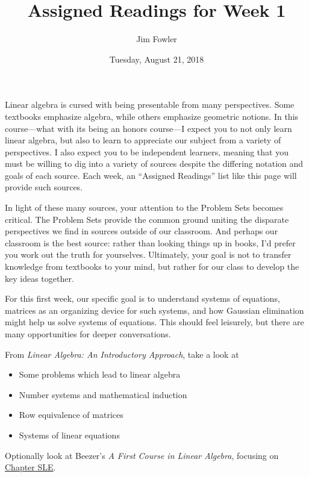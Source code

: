 \documentclass{homework}
\author{Jim Fowler}
\title{Assigned Readings for Week 1}
\date{Tuesday, August 21, 2018}
\begin{document}
\maketitle

Linear algebra is cursed with being presentable from many
perspectives.  Some textbooks emphasize algebra, while others
emphasize geometric notions.  In this course---what with its being an
honors course---I expect you to not only learn linear algebra, but
also to learn to appreciate our subject from a variety of
perspectives.  I also expect you to be independent learners, meaning
that you must be willing to dig into a variety of sources despite the
differing notation and goals of each source.  Each week, an ``Assigned
Readings'' list like this page will provide such sources.

In light of these many sources, your attention to the Problem Sets
becomes critical.  The Problem Sets provide the common ground uniting
the disparate perspectives we find in sources outside of our
classroom.  And perhaps our classroom is the best source: rather than
looking things up in books, I'd prefer you work out the truth for
yourselves.  Ultimately, your goal is not to transfer knowledge from
textbooks to your mind, but rather for our class to develop the key
ideas together.

For this first week, our specific goal is to understand systems of
equations, matrices as an organizing device for such systems, and how
Gaussian elimination might help us solve systems of equations.  This
should feel leisurely, but there are many opportunities for deeper
conversations.

From \textit{Linear Algebra: An Introductory Approach}, take a look at
\begin{itemize}
\item {} Some problems which lead to linear algebra
\item {} Number systems and mathematical induction
\item {} Row equivalence of matrices
\item {} Systems of linear equations
\end{itemize}
Optionally look at Beezer's \textit{A First Course in Linear Algebra},
focusing on
\href{http://linear.ups.edu/html/chapter-SLE.html}{Chapter SLE}.
\end{document}
